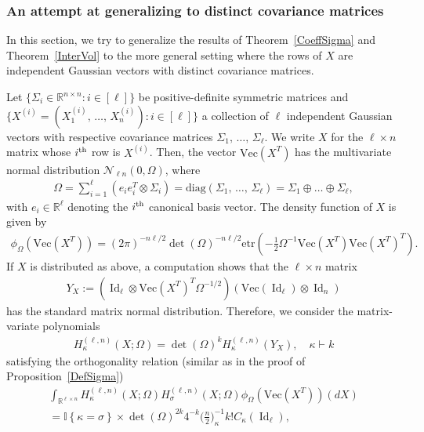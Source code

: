 \documentclass[AHL,Unicode,longabstracts,published]{cedram}
\DeclareMathOperator{\Id}{Id}
\newcommand{\diag}{\mathrm{diag}}
\renewcommand{\Vec}{\mathrm{Vec}}
\newcommand{\clN}{\mathcal{N}}
\newcommand{\R}{\mathbb{R}}
\newcommand{\ind}[1]{\mathbb{I}
\left\{#1\right\}}
\newcommand{\etr}[1]{\mathrm{etr}\left(#1\right)}
\begin{document}
\subsubsection{An attempt at generalizing to distinct covariance matrices}\label{General}
In this section, we try to generalize the results of Theorem~\ref{CoeffSigma} and Theorem~\ref{InterVol} to the more general setting where the rows of $X$ are independent Gaussian vectors with distinct covariance matrices.

Let $\{\Sigma_i \in \R^{n\times n} : i\in [\ell]\}$ be positive-definite symmetric matrices and $\{X^{(i)}=(X^{(i)}_1,\,\ldots,\,X^{(i)}_n):i\in [\ell]\}$ a collection of $\ell$ independent Gaussian vectors with respective covariance matrices $\Sigma_1,\,\ldots,\,\Sigma_{\ell}$. We write $X$ for the $\ell \times n$ matrix whose $i^{\rm th}$ row is $X^{(i)}$. Then, the vector $\Vec(X^T)$ has the multivariate normal distribution $\clN_{\ell n}(0,\Omega)$, where
\begin{gather*}
\Omega= \sum_{i=1}^{\ell} \left(e_ie_i^T \otimes \Sigma_i\right) = \diag(\Sigma_1,\,\ldots,\,\Sigma_{\ell}) = \Sigma_1 \oplus \ldots \oplus \Sigma_{\ell},
\end{gather*}
with $e_i \in \R^{\ell}$ denoting the $i^{\rm th}$ canonical basis vector. The density function of $X$ is given by
\begin{gather*}
\phi_{\Omega}\left(\Vec\left(X^T\right)\right) = (2\pi)^{-n\ell/2} \det(\Omega)^{-n\ell/2} \etr{ -\frac{1}{2} \Omega^{-1}\Vec\left(X^T\right)\Vec\left(X^T\right)^T}.
\end{gather*}
If $X $ is distributed as above, a computation shows that the $\ell \times n$ matrix
\begin{gather*}
Y_X:= \left(\Id_{\ell} \otimes \Vec\left(X^T\right)^T \Omega^{-1/2}\right) \left(\Vec(\Id_{\ell}) \otimes \Id_n\right)
\end{gather*}
has the standard matrix normal distribution. Therefore, we consider the matrix-variate polynomials
\begin{gather}\label{HerOmega}
H^{(\ell,n)}_{\kappa}(X;\Omega) = \det(\Omega)^{k} H_{\kappa}^{(\ell,n)}(Y_X), \quad \kappa \vdash k
\end{gather}
satisfying the orthogonality relation (similar as in the proof of Proposition~\ref{DefSigma})
\begin{multline*}
\int_{\R^{\ell \times n}} H^{(\ell,n)}_{\kappa}(X;\Omega) H^{(\ell,n)}_{\sigma}(X;\Omega) \phi_{\Omega}(\Vec(X^T)) (dX)
\\
= \ind{\kappa=\sigma} \times \det(\Omega)^{2k } 4^{-k}\bigg(\frac{n}{2}\bigg)_{\kappa}^{-1} k !C_{\kappa}(\Id_{\ell}),
\end{multline*}
\end{document}
